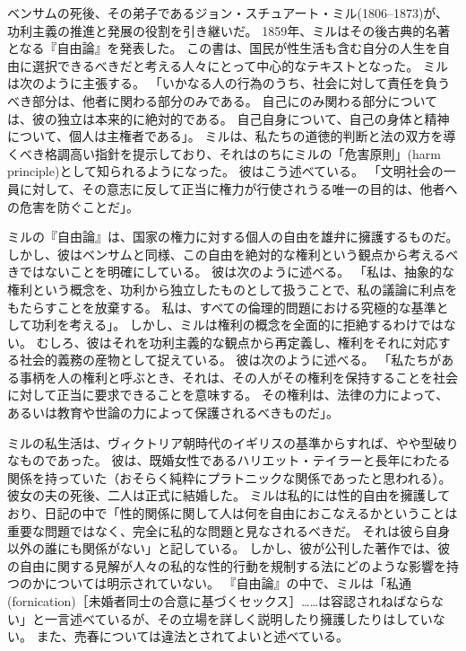 \documentclass[paper=a4,book,openany]{jlreq}
\begin{document}
ベンサムの死後、その弟子であるジョン・スチュアート・ミル(1806--1873)が、功利主義の推進と発展の役割を引き継いだ。
1859年、ミルはその後古典的名著となる『自由論』を発表した。
この書は、国民が性生活も含む自分の人生を自由に選択できるべきだと考える人々にとって中心的なテキストとなった。
ミルは次のように主張する。
「いかなる人の行為のうち、社会に対して責任を負うべき部分は、他者に関わる部分のみである。
自己にのみ関わる部分については、彼の独立は本来的に絶対的である。
自己自身について、自己の身体と精神について、個人は主権者である」\citep[p.13]{mill15:_liber_utilit_other_essay}。
ミルは、私たちの道徳的判断と法の双方を導くべき格調高い指針を提示しており、それはのちにミルの「危害原則」(harm principle)として知られるようになった。
彼はこう述べている。
「文明社会の一員に対して、その意志に反して正当に権力が行使されうる唯一の目的は、他者への危害を防ぐことだ」\citep[p.13]{mill15:_liber_utilit_other_essay}。

ミルの『自由論』は、国家の権力に対する個人の自由を雄弁に擁護するものだ。
しかし、彼はベンサムと同様、この自由を絶対的な権利という観点から考えるべきではないことを明確にしている。
彼は次のように述べる。
「私は、抽象的な権利という概念を、功利から独立したものとして扱うことで、私の議論に利点をもたらすことを放棄する。
私は、すべての倫理的問題における究極的な基準として功利を考える」\citep[p.14]{mill15:_liber_utilit_other_essay}。
しかし、ミルは権利の概念を全面的に拒絶するわけではない。
むしろ、彼はそれを功利主義的な観点から再定義し、権利をそれに対応する社会的義務の産物として捉えている。
彼は次のように述べる。
「私たちがある事柄を人の権利と呼ぶとき、それは、その人がその権利を保持することを社会に対して正当に要求できることを意味する。
その権利は、法律の力によって、あるいは教育や世論の力によって保護されるべきものだ」\citep[p.166]{mill15:_liber_utilit_other_essay}。

ミルの私生活は、ヴィクトリア朝時代のイギリスの基準からすれば、やや型破りなものであった。
彼は、既婚女性であるハリエット・テイラーと長年にわたる関係を持っていた（おそらく純粋にプラトニックな関係であったと思われる）。
彼女の夫の死後、二人は正式に結婚した。
ミルは私的には性的自由を擁護しており、日記の中で「性的関係に関して人は何を自由におこなえるかということは重要な問題ではなく、完全に私的な問題と見なされるべきだ。
それは彼ら自身以外の誰にも関係がない」と記している\citep[p.664]{mill88:diary}。
しかし、彼が公刊した著作では、彼の自由に関する見解が人々の私的な性的行動を規制する法にどのような影響を持つのかについては明示されていない。
『自由論』の中で、ミルは「私通(fornication)［未婚者同士の合意に基づくセックス］……は容認されねばならない」と一言述べているが、その立場を詳しく説明したり擁護したりはしていない。
また、売春については違法とされてよいと述べている\citep[p.96]{mill15:_liber_utilit_other_essay}。
\end{document}

